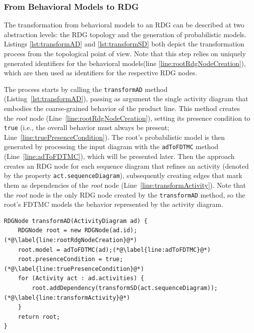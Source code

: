 \subsubsection{From Behavioral Models to RDG}
\label{subsubsec:umlToRDG}

The transformation from behavioral models to an RDG can be described at two
abstraction levels: the RDG topology and the generation of probabilistic models.
Listings \ref{lst:transformAD} and \ref{lst:transformSD} both depict the
transformation process from the topological point of view.  Note that this step
relies on uniquely generated identifiers for the behavioral models(line
\ref{line:rootRdgNodeCreation}), which are
then used as identifiers for the respective RDG nodes.

The process starts by calling the \texttt{transformAD} method
(Listing~\ref{lst:transformAD}), passing as argument the single activity diagram
that embodies the coarse-grained behavior of the product line.  This method
creates the \emph{root} node (Line~\ref{line:rootRdgNodeCreation}), setting its
presence condition to \texttt{true} (i.e., the overall behavior must always be
present; Line~\ref{line:truePresenceCondition}).  The root's probabilistic model
is then generated by processing the input diagram with the
\texttt{ad\-To\-FDTMC} method (Line~\ref{line:adToFDTMC}), which will be
presented later.  Then the approach creates an RDG node for each sequence
diagram that refines an activity (denoted by the property
\texttt{act.se\-quence\-Di\-a\-gram}), subsequently creating edges that mark
them as dependencies of the \emph{root} node
(Line~\ref{line:transformActivity}).  Note that the \textit{root} node is the
only RDG node created by the \texttt{transformAD} method, so the root's FDTMC
models the behavior represented by the activity diagram.

\begin{lstlisting}[label={lst:transformAD},
                   caption={Activity diagram transformation},
                   float,
                   breaklines,
		   belowcaptionskip=0.2cm]
RDGNode transformAD(ActivityDiagram ad) {
    RDGNode root = new RDGNode(ad.id);(*@\label{line:rootRdgNodeCreation}@*)
    root.model = adToFDTMC(ad);(*@\label{line:adToFDTMC}@*)
    root.presenceCondition = true;(*@\label{line:truePresenceCondition}@*)
    for (Activity act : ad.activities) {
        root.addDependency(transformSD(act.sequenceDiagram));(*@\label{line:transformActivity}@*)
    }
    return root;
}
\end{lstlisting}

